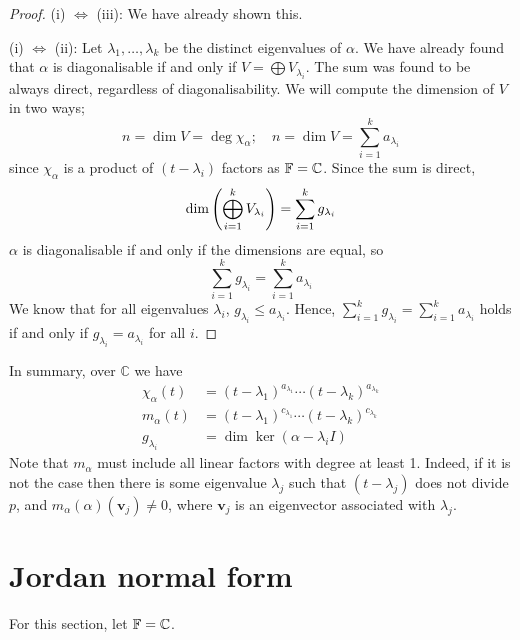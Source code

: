 \documentclass[a4paper,11pt]{article}
\begin{document}
\begin{proof}
	(i) $\iff$ (iii): We have already shown this. 

	(i) $\iff$ (ii): Let \( \lambda_1, \dots, \lambda_k \) be the distinct eigenvalues of \( \alpha \).
	We have already found that \( \alpha \) is diagonalisable if and only if \( V = \bigoplus V_{\lambda_i} \).
	The sum was found to be always direct, regardless of diagonalisability.
	We will compute the dimension of \( V \) in two ways;
	\[
		n = \dim V = \deg \chi_\alpha;\quad n = \dim V = \sum_{i=1}^k a_{\lambda_i}
	\]
	since \( \chi_\alpha \) is a product of \( (t-\lambda_i) \) factors as \( {\mathbb{F}} = \mathbb C \).
	Since the sum is direct,
	\[
		\dim \qty(\bigoplus_{i=1}^k V_{\lambda_i}) = \sum_{i=1}^k g_{\lambda_i}
	\]
	\( \alpha \) is diagonalisable if and only if the dimensions are equal, so
	\[
		\sum_{i=1}^k g_{\lambda_i} = \sum_{i=1}^k a_{\lambda_i}
	\]
	We know that for all eigenvalues \( \lambda_i \), \( g_{\lambda_i} \leq a_{\lambda_i} \).
	Hence, \( \sum_{i=1}^k g_{\lambda_i} = \sum_{i=1}^k a_{\lambda_i} \) holds if and only if \( g_{\lambda_i} = a_{\lambda_i} \) for all \( i \).
\end{proof}

In summary, over $ \mathbb{C} $ we have 
\begin{align*}
	\chi_\alpha(t) & = (t-\lambda_1)^{a_{\lambda_1}}\cdots (t-\lambda_k)^{a_{\lambda_k}}\\ 
	m_\alpha(t) & = (t-\lambda_1)^{c_{\lambda_1}}\cdots (t-\lambda_k)^{c_{\lambda_k}}\\ 
	g_{\lambda_i} &= \dim \ker (\alpha- \lambda_i I)
\end{align*}
Note that $ m_\alpha $ must include all linear factors with degree at least 1. Indeed, if it is not the case then there is some eigenvalue $ \lambda_j $ such that $ (t-\lambda_j) $ does not divide $p$, and $ m_\alpha(\alpha)(\mathbf{v}_j)\neq 0 $, where $\mathbf{v}_j$ is an eigenvector associated with $\lambda_j$.

\section{Jordan normal form}
For this section, let \( {\mathbb{F}} = \mathbb C \).
\end{document}
